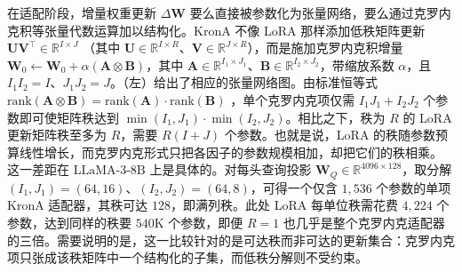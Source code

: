 \documentclass[11pt]{article}
\newcommand{\R}{\mathbb{R}}
\newcommand{\mat}[1]{\mathbf{#1}}
\newcommand{\llama}{\text{LLaMA-3-8B}}
\begin{document}
在适配阶段，增量权重更新 $\Delta \mat{W}$ 要么直接被参数化为张量网络，要么通过克罗内克积等张量代数运算加以结构化。KronA \cite{edalati2022krona} 不像 LoRA 那样添加低秩矩阵更新 $\mat{U}\mat{V}^\top \in\R^{I\times J}$ \cite{hu2022lora}（其中 $\mat{U}\in \R^{I \times R}$、$\mat{V} \in \R^{J \times R}$），而是施加克罗内克积增量 $\mat{W}_0 \leftarrow \mat{W}_0 + \alpha(\mat{A}\otimes\mat{B})$，其中 $\mat{A}\in\R^{I_1\times J_1}$、$\mat{B}\in\R^{I_2\times J_2}$，带缩放系数 $\alpha$，且 $I_1 I_2 = I$、$J_1 J_2 = J$。（左）给出了相应的张量网络图。由标准恒等式 $\mathrm{rank}(\mat{A}\otimes\mat{B})=\mathrm{rank}(\mat{A})\cdot\mathrm{rank}(\mat{B})$ \cite{golubvanloan}，单个克罗内克项仅需 $I_1J_1+I_2J_2$ 个参数即可使矩阵秩达到 $\min(I_1,J_1)\cdot\min(I_2,J_2)$。相比之下，秩为 $R$ 的 LoRA 更新矩阵秩至多为 $R$，需要 $R(I+J)$ 个参数。也就是说，LoRA 的秩随参数预算线性增长，而克罗内克形式只把各因子的参数规模相加，却把它们的秩相乘。
这一差距在 $\llama$ 上是具体的。对每头查询投影 $\mat{W}_Q\in\R^{4096\times 128}$，取分解 $(I_1,J_1)=(64,16)$、$(I_2,J_2)=(64,8)$，可得一个仅含 $1{,}536$ 个参数的单项 KronA 适配器，其秩可达 $128$，即满列秩。此处 LoRA 每单位秩需花费 $4{,}224$ 个参数，达到同样的秩要 $540$K 个参数，即便 $R=1$ 也几乎是整个克罗内克适配器的三倍。需要说明的是，这一比较针对的是可达秩而非可达的更新集合：克罗内克项只张成该秩矩阵中一个结构化的子集，而低秩分解则不受约束。

\end{document}
